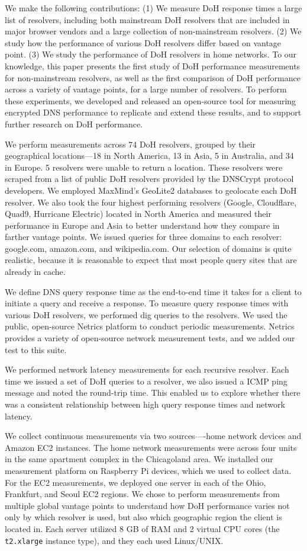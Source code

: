 We make the following contributions: (1) We measure DoH response times a large list of resolvers, including both mainstream DoH resolvers that are included in major browser vendors and a large collection of non-mainstream resolvers. (2) We study how the performance of various DoH resolvers differ based on vantage point. (3) We study the performance of DoH resolvers in home networks. To our knowledge, this paper presents the first study of DoH performance measurements for non-mainstream resolvers, as well as the first comparison of DoH performance across a variety of vantage points, for a large number of resolvers. To perform these experiments, we developed and released an open-source tool for measuring encrypted DNS performance to replicate and extend these results, and to support further research on DoH performance.

We perform measurements across 74 DoH resolvers, grouped by their geographical locations—18 in North America, 13 in Asia, 5 in Australia, and 34 in Europe. 5 resolvers were unable to return a location. These resolvers were scraped from a list of public DoH resolvers provided by the DNSCrypt protocol developers. We employed MaxMind’s GeoLite2 databases to geolocate each DoH resolver. We also took the four highest performing resolvers (Google, Cloudflare, Quad9, Hurricane Electric) located in North America and measured their performance in Europe and Asia to better understand how they compare in farther vantage points. We issued queries for three domains to each resolver: google.com, amazon.com, and wikipedia.com. Our selection of domains is quite realistic, because it is reasonable to expect that most people query sites that are already in cache. 

We define DNS query response time as the
end-to-end time it takes for a client to initiate a query and receive a
response.  To measure query response times with various DoH resolvers, we
performed dig queries to the resolvers. We used the public, open-source Netrics
platform to conduct periodic measurements. Netrics
provides a variety of open-source network measurement tests, and we added our 
test to this suite. 

We performed network latency measurements for each recursive resolver.  Each time
we issued a set of DoH queries to a resolver, we also issued a ICMP ping
message and noted the round-trip time.  This enabled us to explore
whether there was a consistent relationship between high query response times
and network latency.

We collect continuous measurements via two sources—-home network devices and Amazon EC2 instances. The home network measurements were across four units in the same apartment complex in the Chicagoland area. 
We installed our measurement platform on Raspberry Pi devices, which we used to  collect data. 
For the EC2 measurements, we deployed one server
in each of the Ohio, Frankfurt, and Seoul EC2 regions.  We chose to perform
measurements from multiple global vantage points to understand how DoH
performance varies not only by which resolver is used, but also which
geographic region the client is located in.  Each server utilized 8 GB of RAM
and 2 virtual CPU cores (the \texttt{t2.xlarge} instance type), and they each
used Linux/UNIX.

